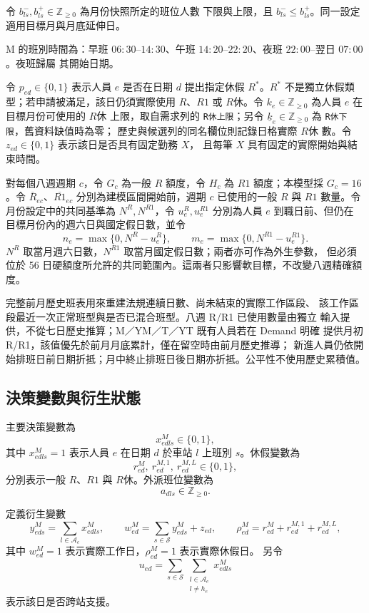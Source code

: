 \documentclass[a4paper,12pt]{article}
\begin{document}
令 \(b^-_{ls},b^+_{ls}\in\mathbb{Z}_{\geq0}\) 為月份快照所定的班位人數
下限與上限，且 \(b^-_{ls}\le b^+_{ls}\)。同一設定適用目標月與月底延伸日。

M 的班別時間為：早班 \(06{:}30\)--\(14{:}30\)、午班
\(14{:}20\)--\(22{:}20\)、夜班 \(22{:}00\)--翌日 \(07{:}00\)。夜班歸屬
其開始日期。

令 \(p_{ed}\in\{0,1\}\) 表示人員 \(e\) 是否在日期 \(d\) 提出指定休假
\(R^*\)。\(R^*\) 不是獨立休假類型；若申請被滿足，該日仍須實際使用
\(R\)、\(R1\) 或 \(R休\)。令 \(k_e\in\mathbb{Z}_{\geq0}\) 為人員 \(e\)
在目標月份可使用的 \(R休\) 上限，取自需求列的 \texttt{R休上限}；另令 \(\underline{k}_e\in\mathbb{Z}_{\geq0}\) 為 \texttt{R休下限}，舊資料缺值時為零；
歷史與候選列的同名欄位則記錄日格實際 \(R休\) 數。令 \(z_{ed}\in\{0,1\}\) 表示該日是否具有固定勤務 \(X\)，
且每筆 \(X\) 具有固定的實際開始與結束時間。

對每個八週週期 \(c\)，令 \(G_c\) 為一般 \(R\) 額度，令 \(H_c\) 為 \(R1\)
額度；本模型採 \(G_c=16\)。令
\(\overline{R}_{ec}\)、\(\overline{R1}_{ec}\) 分別為建模區間開始前，週期
\(c\) 已使用的一般 \(R\) 與 \(R1\) 數量。令月份設定中的共同基準為
\(N^R,N^{R1}\)，令 \(u^R_e,u^{R1}_e\) 分別為人員 \(e\) 到職日前、但仍在
目標月份內的週六日與國定假日數，並令
\[
  n_e=\max\{0,N^R-u^R_e\},
  \qquad
  m_e=\max\{0,N^{R1}-u^{R1}_e\}.
\]
\(N^R\) 取當月週六日數，\(N^{R1}\) 取當月國定假日數；兩者亦可作為外生參數，
但必須位於 56 日硬額度所允許的共同範圍內。這兩者只影響軟目標，不改變八週精確額度。

完整前月歷史班表用來重建法規連續日數、尚未結束的實際工作區段、
該工作區段最近一次正常班型與是否已混合班型。八週 R/R1 已使用數量由獨立
輸入提供，不從七日歷史推算；M／YM／T／YT 既有人員若在 Demand 明確
提供月初 R/R1，該值優先於前月月底累計，僅在留空時由前月歷史推導；
新進人員仍依開始排班日前日期折抵；月中終止排班日後日期亦折抵。公平性不使用歷史累積值。

\subsection{決策變數與衍生狀態}

主要決策變數為
\[
  x^{M}_{edls}\in\{0,1\},
\]
其中 \(x^{M}_{edls}=1\) 表示人員 \(e\) 在日期 \(d\) 於車站 \(l\) 上班別
\(s\)。休假變數為
\[
  r^{M}_{ed},\ r^{M,1}_{ed},\ r^{M,L}_{ed}\in\{0,1\},
\]
分別表示一般 \(R\)、\(R1\) 與 \(R休\)。外派班位變數為
\[
  a_{dls}\in\mathbb{Z}_{\geq0}.
\]

定義衍生變數
\[
  y^{M}_{eds}=\sum_{l\in\mathcal{A}_e}x^{M}_{edls},
  \qquad
  w^{M}_{ed}=\sum_{s\in\mathcal{S}}y^{M}_{eds}+z_{ed},
  \qquad
  \rho^{M}_{ed}=r^{M}_{ed}+r^{M,1}_{ed}+r^{M,L}_{ed},
\]
其中 \(w^{M}_{ed}=1\) 表示實際工作日，\(\rho^{M}_{ed}=1\) 表示實際休假日。
另令
\[
  u_{ed}
  =
  \sum_{s\in\mathcal{S}}
  \sum_{\substack{l\in\mathcal{A}_e\\l\neq h_e}}x^{M}_{edls}
\]
表示該日是否跨站支援。
\end{document}
